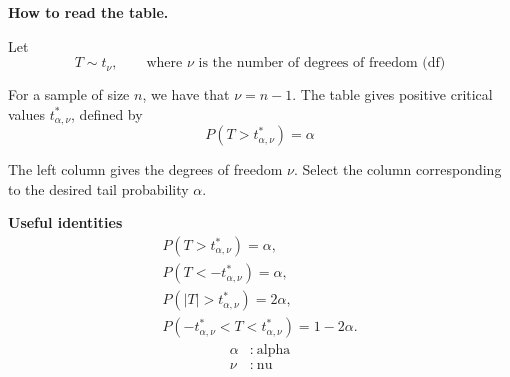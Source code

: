 \noindent
\begin{minipage}[t]{0.68\textwidth}
	\vspace{0pt}
	
	\textbf{How to read the table.}
	
	Let
	\vspace{-3mm}
	\[
	T\sim t_{\nu},
	\qquad
	\textrm{where } \nu \textrm{ is the number of degrees of freedom (df)}
	\]
	
	For a sample of size \(n\), we have that
	$
	\nu=n-1.
	$
	The table gives positive critical values \(t^*_{\alpha,\nu}\), defined by
	\[
	P\!\left(T>t^*_{\alpha,\nu}\right)=\alpha
	\]
	
	The left column gives the degrees of freedom \(\nu\). Select the column
	corresponding to the desired tail probability \(\alpha\).
	
	\vspace{2mm}
	
\end{minipage}%
\hfill
\begin{minipage}[t]{0.28\textwidth}
	\vspace{0pt}
	\centering
	\textbf{Useful identities}
	\vspace{-2mm}
	\begin{gather*}
		P\!\left(T>t^*_{\alpha,\nu}\right)=\alpha,\\
		P\!\left(T<-t^*_{\alpha,\nu}\right)=\alpha,\\
		P\!\left(|T|>t^*_{\alpha,\nu}\right)=2\alpha,\\
		P\!\left(-t^*_{\alpha,\nu}<T<t^*_{\alpha,\nu}\right)=1-2\alpha.
	\end{gather*}
	\[
	\begin{aligned}
		\alpha &:\ \textrm{alpha} \\
		\nu    &:\ \textrm{nu}
	\end{aligned}
	\]
	
\end{minipage}

\begin{center}
\end{center}

